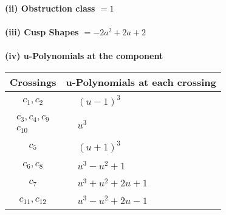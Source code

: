\documentclass[1p]{elsarticle_modified}
\theoremstyle{definition}
\begin{document}
\flushleft \textbf{(ii) Obstruction class $= 1$}\\~\\
\flushleft \textbf{(iii) Cusp Shapes $= -2 a^2+2 a+2$}\\~\\
\newpage\renewcommand{\arraystretch}{1}
\flushleft \textbf{(iv) u-Polynomials at the component}\newline \\
\begin{tabular}{m{50pt}|m{274pt}}
Crossings & \hspace{64pt}u-Polynomials at each crossing \\
\hline $$\begin{aligned}c_{1},c_{2}\end{aligned}$$&$\begin{aligned}
&(u-1)^3
\end{aligned}$\\
\hline $$\begin{aligned}c_{3},c_{4},c_{9}\\c_{10}\end{aligned}$$&$\begin{aligned}
&u^3
\end{aligned}$\\
\hline $$\begin{aligned}c_{5}\end{aligned}$$&$\begin{aligned}
&(u+1)^3
\end{aligned}$\\
\hline $$\begin{aligned}c_{6},c_{8}\end{aligned}$$&$\begin{aligned}
&u^3- u^2+1
\end{aligned}$\\
\hline $$\begin{aligned}c_{7}\end{aligned}$$&$\begin{aligned}
&u^3+u^2+2 u+1
\end{aligned}$\\
\hline $$\begin{aligned}c_{11},c_{12}\end{aligned}$$&$\begin{aligned}
&u^3- u^2+2 u-1
\end{aligned}$\\
\hline
\end{tabular}\\~\\
\end{document}

